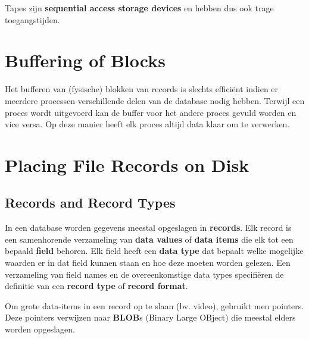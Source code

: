 Tapes zijn \textbf{sequential access storage devices} en hebben dus ook trage toegangstijden.



\section{Buffering of Blocks}
Het bufferen van (fysische) blokken van records is slechts effici\"ent indien er meerdere processen verschillende delen van de database nodig hebben. Terwijl een proces wordt uitgevoerd kan de buffer voor het andere proces gevuld worden en vice versa. Op deze manier heeft elk proces altijd data klaar om te verwerken.



\section{Placing File Records on Disk}
\subsection{Records and Record Types}
In een database worden gegevens meestal opgeslagen in \textbf{records}. Elk record is een samenhorende verzameling van \textbf{data values} of \textbf{data items} die elk tot een bepaald \textbf{field} behoren. Elk field heeft een \textbf{data type} dat bepaalt welke mogelijke waarden er in dat field kunnen staan en hoe deze moeten worden gelezen. Een verzameling van field names en de overeenkomstige data types specifi\"eren de definitie van een \textbf{record type} of \textbf{record format}.

Om grote data-items in een record op te slaan (bv. video), gebruikt men pointers. Deze pointers verwijzen naar \textbf{BLOB}s (Binary Large OBject) die meestal elders worden opgeslagen.


